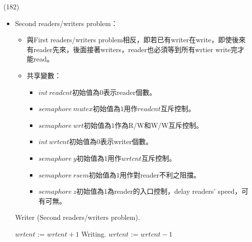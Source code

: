 \begin{theorem}{(182)}
\begin{itemize}
\begin{algorithm}[H]
\begin{algorithmic}[1]
                            \State {} 
                        \EndIf
                        \State {}
                \EndFunction
            \end{algorithmic}
        \end{algorithm}
        \item Second readers/writers problem：\begin{itemize}
            \item 與First readers/writers problem相反，即若已有writer在write，即使後來有reader先來，後面接著writers，reader也必須等到所有wrtier write完才能read。
            \item 共享變數：\begin{itemize}
                \item $int \ readcnt$初始值為$0$表示reader個數。
                \item $semaphore \ mutex$初始值為$1$用作$readcnt$互斥控制。
                \item $semaphore \ wrt$初始值為$1$作為R/W和W/W互斥控制。
                \item $int \ wrtcnt$初始值為$0$表示writer個數。
                \item $semaphore \ y$初始值為$1$用作$wrtcnt$互斥控制。
                \item $semaphore \ rsem$初始值為$1$用作對reader不利之阻擋。
                \item $semaphore \ z$初始值為$1$為reader的入口控制，delay readers' speed，可有可無。
            \end{itemize}
        \end{itemize}
        \begin{algorithm}[H]
            \caption{Writer (Second readers/writers problem).}
            \begin{algorithmic}[1]
                    \Repeat
                        \State {} 
                        \State $wrtcnt$ := $wrtcnt + 1$
                         
                            \State {}
                        \EndIf
                        \State {}
                        \State {}
                        \State Writing.
                        \State {}
                        \State $wrtcnt$ := $wrtcnt - 1$
                            \State {} 

\end{algorithmic}
\end{algorithm}
\end{itemize}
\end{theorem}
